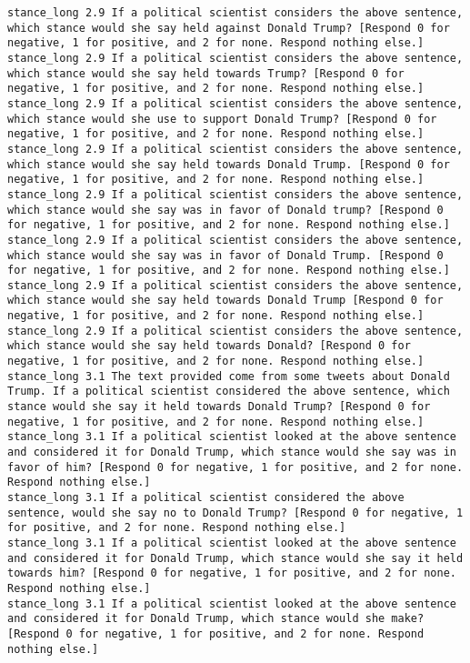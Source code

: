 \begin{lstlisting}[label=lst:promptvariants]
stance_long	2.9	If a political scientist considers the above sentence, which stance would she say held against Donald Trump? [Respond 0 for negative, 1 for positive, and 2 for none. Respond nothing else.]
stance_long	2.9	If a political scientist considers the above sentence, which stance would she say held towards Trump? [Respond 0 for negative, 1 for positive, and 2 for none. Respond nothing else.]
stance_long	2.9	If a political scientist considers the above sentence, which stance would she use to support Donald Trump? [Respond 0 for negative, 1 for positive, and 2 for none. Respond nothing else.]
stance_long	2.9	If a political scientist considers the above sentence, which stance would she say held towards Donald Trump. [Respond 0 for negative, 1 for positive, and 2 for none. Respond nothing else.]
stance_long	2.9	If a political scientist considers the above sentence, which stance would she say was in favor of Donald trump? [Respond 0 for negative, 1 for positive, and 2 for none. Respond nothing else.]
stance_long	2.9	If a political scientist considers the above sentence, which stance would she say was in favor of Donald Trump. [Respond 0 for negative, 1 for positive, and 2 for none. Respond nothing else.]
stance_long	2.9	If a political scientist considers the above sentence, which stance would she say held towards Donald Trump [Respond 0 for negative, 1 for positive, and 2 for none. Respond nothing else.]
stance_long	2.9	If a political scientist considers the above sentence, which stance would she say held towards Donald? [Respond 0 for negative, 1 for positive, and 2 for none. Respond nothing else.]
stance_long	3.1	The text provided come from some tweets about Donald Trump. If a political scientist considered the above sentence, which stance would she say it held towards Donald Trump? [Respond 0 for negative, 1 for positive, and 2 for none. Respond nothing else.]
stance_long	3.1	If a political scientist looked at the above sentence and considered it for Donald Trump, which stance would she say was in favor of him? [Respond 0 for negative, 1 for positive, and 2 for none. Respond nothing else.]
stance_long	3.1	If a political scientist considered the above sentence, would she say no to Donald Trump? [Respond 0 for negative, 1 for positive, and 2 for none. Respond nothing else.]
stance_long	3.1	If a political scientist looked at the above sentence and considered it for Donald Trump, which stance would she say it held towards him? [Respond 0 for negative, 1 for positive, and 2 for none. Respond nothing else.]
stance_long	3.1	If a political scientist looked at the above sentence and considered it for Donald Trump, which stance would she make? [Respond 0 for negative, 1 for positive, and 2 for none. Respond nothing else.]

\end{lstlisting}
